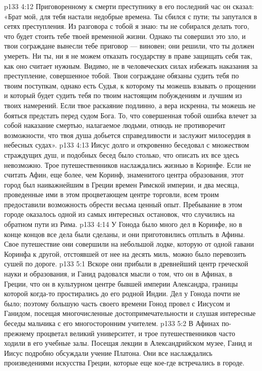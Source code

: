 \vs p133 4:12 \pc Приговоренному к смерти преступнику в его последний час он сказал: «Брат мой, для тебя настали недобрые времена. Ты сбился с пути; ты запутался в сетях преступления. Из разговора с тобой я знаю: ты не собирался делать того, что будет стоить тебе твоей временной жизни. Однако ты совершил это зло, и твои сограждане вынесли тебе приговор --- виновен; они решили, что ты должен умереть. Ни ты, ни я не можем отказать государству в праве защищать себя так, как оно считает нужным. Видимо, не в человеческих силах избежать наказания за преступление, совершенное тобой. Твои сограждане обязаны судить тебя по твоим поступкам, однако есть Судья, к которому ты можешь взывать о прощении и который будет судить тебя по твоим настоящим побуждениям и лучшим из твоих намерений. Если твое раскаяние подлинно, а вера искренна, ты можешь не бояться предстать перед судом Бога. То, что совершенная тобой ошибка влечет за собой наказание смертью, налагаемое людьми, отнюдь не противоречит возможности, что твоя душа добьется справедливости и заслужит милосердия в небесных судах».
\vs p133 4:13 \pc Иисус долго и откровенно беседовал с множеством страждущих душ, и подобных бесед было столько, что описать их все здесь невозможно. Трое путешественников наслаждались жизнью в Коринфе. Если не считать Афин, еще более, чем Коринф, знаменитого центра образования, этот город был наиважнейшим в Греции времен Римской империи, и два месяца, проведенные ими в этом процветающем центре торговли, всем троим предоставили возможность обрести весьма ценный опыт. Пребывание в этом городе оказалось одной из самых интересных остановок, что случились на обратном пути из Рима.
\vs p133 4:14 У Гонода было много дел в Коринфе, но в конце концов все дела были сделаны, и они приготовились отплыть в Афины. Свое путешествие они совершили на небольшой лодке, которую от одной гавани Коринфа к другой, отстоявшей от нее на десять миль, можно было перевозить сушей по дороге.
\vs p133 5:1 Вскоре они прибыли в древнейший центр греческой науки и образования, и Ганид радовался мысли о том, что он в Афинах, в Греции, что он в культурном центре бывшей империи Александра, границы которой когда\hyp{}то простирались до его родной Индии. Дел у Гонода почти не было; поэтому большую часть своего времени Гонод провел с Иисусом и Ганидом, посещая многочисленные достопримечательности и слушая интересные беседы мальчика с его многосторонним учителем.
\vs p133 5:2 В Афинах по\hyp{}прежнему процветал великий университет, и трое путешественников часто ходили в его учебные залы. Посещая лекции в Александрийском музее, Ганид и Иисус подробно обсуждали учение Платона. Они все наслаждались произведениями искусства Греции, которые еще кое\hyp{}где встречались в городе.

